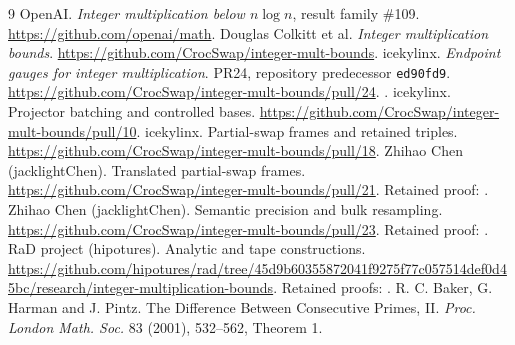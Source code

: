 \documentclass[11pt]{article}
\begin{document}
\begin{thebibliography}{9}
 OpenAI. \emph{Integer multiplication below $n\log n$},
result family \#109. \url{https://github.com/openai/math}.
 Douglas Colkitt et al. \emph{Integer multiplication bounds}.
\url{https://github.com/CrocSwap/integer-mult-bounds}.
 icekylinx. \emph{Endpoint gauges for integer multiplication}.
PR24, repository predecessor \texttt{ed90fd9}.
\url{https://github.com/CrocSwap/integer-mult-bounds/pull/24}.
.
 icekylinx. Projector batching and controlled bases.
\url{https://github.com/CrocSwap/integer-mult-bounds/pull/10}.
 icekylinx. Partial-swap frames and retained triples.
\url{https://github.com/CrocSwap/integer-mult-bounds/pull/18}.
 Zhihao Chen (jacklightChen). Translated partial-swap frames.
\url{https://github.com/CrocSwap/integer-mult-bounds/pull/21}.
Retained proof: .
 Zhihao Chen (jacklightChen). Semantic precision and bulk
resampling. \url{https://github.com/CrocSwap/integer-mult-bounds/pull/23}.
Retained proof: .
 RaD project (hipotures). Analytic and tape constructions.
\url{https://github.com/hipotures/rad/tree/45d9b60355872041f9275f77c057514def0d45bc/research/integer-multiplication-bounds}.
Retained proofs: .
 R. C. Baker, G. Harman and J. Pintz.
The Difference Between Consecutive Primes, II.
\emph{Proc. London Math. Soc.} 83 (2001), 532--562, Theorem 1.
\end{thebibliography}
\end{document}
